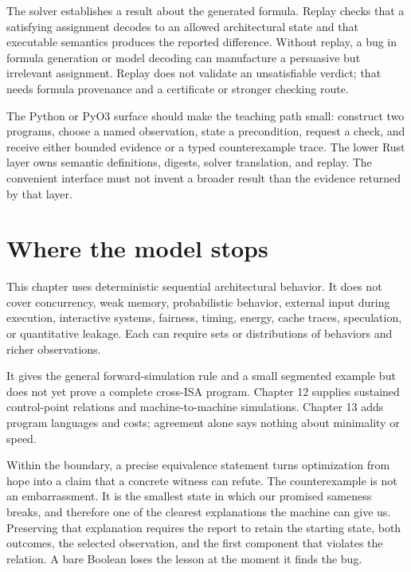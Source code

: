 \begin{proofkit}[title={Why replay is load-bearing}]
The solver establishes a result about the generated formula. Replay checks
that a satisfying assignment decodes to an allowed architectural state and
that executable semantics produces the reported difference. Without replay,
a bug in formula generation or model decoding can manufacture a persuasive
but irrelevant assignment. Replay does not validate an unsatisfiable verdict;
that needs formula provenance and a certificate or stronger checking route.
\end{proofkit}

The Python or PyO3 surface should make the teaching path small: construct two
programs, choose a named observation, state a precondition, request a check,
and receive either bounded evidence or a typed counterexample trace. The lower
Rust layer owns semantic definitions, digests, solver translation, and replay.
The convenient interface must not invent a broader result than the evidence
returned by that layer.

\section{Where the model stops}

This chapter uses deterministic sequential architectural behavior. It does not
cover concurrency, weak memory, probabilistic behavior, external input during
execution, interactive systems, fairness, timing, energy, cache traces,
speculation, or quantitative leakage. Each can require sets or distributions
of behaviors and richer observations.

It gives the general forward-simulation rule and a small segmented example but
does not yet prove a complete cross-ISA program. Chapter 12 supplies sustained
control-point relations and machine-to-machine simulations. Chapter 13 adds
program languages and costs; agreement alone says nothing about minimality or
speed.

Within the boundary, a precise equivalence statement turns optimization from
hope into a claim that a concrete witness can refute. The counterexample is not
an embarrassment. It is
the smallest state in which our promised sameness breaks, and therefore one of
the clearest explanations the machine can give us.
Preserving that explanation requires the report to retain the starting state,
both outcomes, the selected observation, and the first component that violates
the relation. A bare Boolean loses the lesson at the moment it finds the bug.


